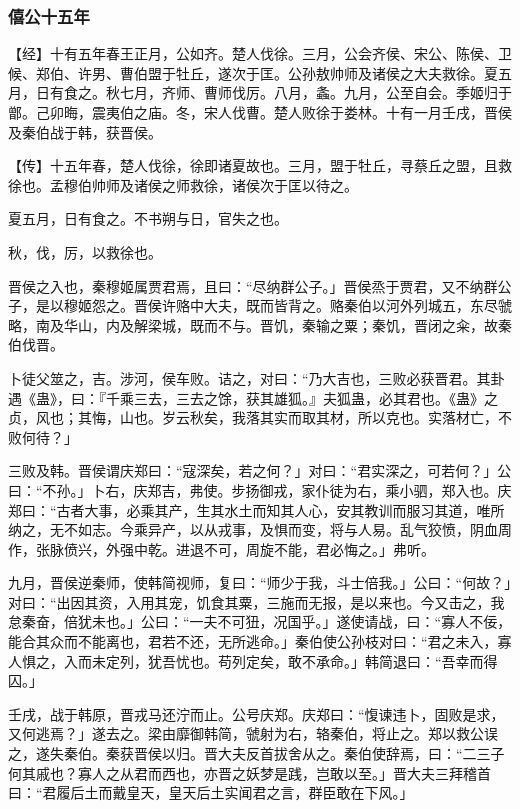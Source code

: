 \documentclass[]{article}
\begin{document}
\hypertarget{header-n796}{%
\subsubsection{僖公十五年}\label{header-n796}}

【经】十有五年春王正月，公如齐。楚人伐徐。三月，公会齐侯、宋公、陈侯、卫候、郑伯、许男、曹伯盟于牡丘，遂次于匡。公孙敖帅师及诸侯之大夫救徐。夏五月，日有食之。秋七月，齐师、曹师伐厉。八月，螽。九月，公至自会。季姬归于鄫。己卯晦，震夷伯之庙。冬，宋人伐曹。楚人败徐于娄林。十有一月壬戌，晋侯及秦伯战于韩，获晋侯。

【传】十五年春，楚人伐徐，徐即诸夏故也。三月，盟于牡丘，寻蔡丘之盟，且救徐也。孟穆伯帅师及诸侯之师救徐，诸侯次于匡以待之。

夏五月，日有食之。不书朔与日，官失之也。

秋，伐，厉，以救徐也。

晋侯之入也，秦穆姬属贾君焉，且曰：``尽纳群公子。」晋侯烝于贾君，又不纳群公子，是以穆姬怨之。晋侯许赂中大夫，既而皆背之。赂秦伯以河外列城五，东尽虢略，南及华山，内及解梁城，既而不与。晋饥，秦输之粟；秦饥，晋闭之籴，故秦伯伐晋。

卜徒父筮之，吉。涉河，侯车败。诘之，对曰：``乃大吉也，三败必获晋君。其卦遇《蛊》，曰：『千乘三去，三去之馀，获其雄狐。』夫狐蛊，必其君也。《蛊》之贞，风也；其悔，山也。岁云秋矣，我落其实而取其材，所以克也。实落材亡，不败何待？」

三败及韩。晋侯谓庆郑曰：``寇深矣，若之何？」对曰：``君实深之，可若何？」公曰：``不孙。」卜右，庆郑吉，弗使。步扬御戎，家仆徒为右，乘小驷，郑入也。庆郑曰：``古者大事，必乘其产，生其水土而知其人心，安其教训而服习其道，唯所纳之，无不如志。今乘异产，以从戎事，及惧而变，将与人易。乱气狡愤，阴血周作，张脉偾兴，外强中乾。进退不可，周旋不能，君必悔之。」弗听。

九月，晋侯逆秦师，使韩简视师，复曰：``师少于我，斗士倍我。」公曰：``何故？」对曰：``出因其资，入用其宠，饥食其粟，三施而无报，是以来也。今又击之，我怠秦奋，倍犹未也。」公曰：``一夫不可狃，况国乎。」遂使请战，曰：``寡人不佞，能合其众而不能离也，君若不还，无所逃命。」秦伯使公孙枝对曰：``君之未入，寡人惧之，入而未定列，犹吾忧也。苟列定矣，敢不承命。」韩简退曰：``吾幸而得囚。」

壬戌，战于韩原，晋戎马还泞而止。公号庆郑。庆郑曰：``愎谏违卜，固败是求，又何逃焉？」遂去之。梁由靡御韩简，虢射为右，辂秦伯，将止之。郑以救公误之，遂失秦伯。秦获晋侯以归。晋大夫反首拔舍从之。秦伯使辞焉，曰：``二三子何其戚也？寡人之从君而西也，亦晋之妖梦是践，岂敢以至。」晋大夫三拜稽首曰：``君履后土而戴皇天，皇天后土实闻君之言，群臣敢在下风。」
\end{document}
